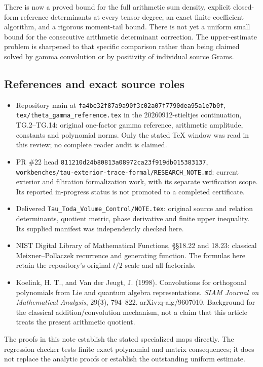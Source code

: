 There is now a proved bound for the full arithmetic sum density, explicit closed-form reference
determinants at every tensor degree, an exact finite coefficient algorithm, and a rigorous
moment-tail bound. There is not yet a uniform small bound for the consecutive arithmetic determinant
correction. The upper-estimate problem is sharpened to that specific comparison rather than being
claimed solved by gamma convolution or by positivity of individual source Grams.

\subsection{References and exact source roles}\label{gamma_convolution:references-and-exact-source-roles}

\begin{itemize}
\tightlist
\item
  Repository main at \nolinkurl{fa4be32f87a9a90f3c02a07f7790dea95a1e7b0f},
  \nolinkurl{tex/theta_gamma_reference.tex} in the 20260912-stieltjes continuation, TG.2--TG.14:
  original one-factor gamma reference, arithmetic amplitude, constants and polynomial norms. Only
  the stated TeX window was read in this review; no complete reader audit is claimed.
\item
  PR \#22 head \nolinkurl{811210d24b80813a08972ca23f919db015383137},
  \nolinkurl{workbenches/tau-exterior-trace-formal/RESEARCH_NOTE.md}: current exterior and filtration
  formalization work, with its separate verification scope. Its reported in-progress status is not
  promoted to a completed certificate.
\item
  Delivered \nolinkurl{Tau_Toda_Volume_Control/NOTE.tex}: original source and relation determinants,
  quotient metric, phase derivative and finite upper inequality. Its supplied manifest was
  independently checked here.
\item
  NIST Digital Library of Mathematical Functions, §§18.22 and 18.23: classical Meixner--Pollaczek
  recurrence and generating function. The formulas here retain the repository's original \(t/2\)
  scale and all factorials.
\item
  Koelink, H. T., and Van der Jeugt, J. (1998). Convolutions for orthogonal polynomials from Lie and
  quantum algebra representations. \emph{SIAM Journal on Mathematical Analysis}, 29(3), 794--822.
  arXiv:q-alg/9607010. Background for the classical addition/convolution mechanism, not a claim that
  this article treats the present arithmetic quotient.
\end{itemize}

The proofs in this note establish the stated specialized maps directly. The regression checker tests
finite exact polynomial and matrix consequences; it does not replace the analytic proofs or
establish the outstanding uniform estimate.
